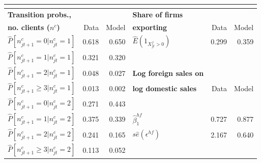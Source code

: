 \documentclass[notes=show]{beamer}
\begin{document}
\begin{frame}%


\begin{center}
{\small 
\begin{tabular}{llllll}
\multicolumn{6}{c}{} \\ \hline\hline
\textbf{Transition probs., }                   &                           &                           & \textbf{Share of firms }        &                            &                           \\
\textbf{no. clients (}$n^{c}$\textbf{)}        & \multicolumn{1}{r}{Data}  & \multicolumn{1}{r}{Model} & \textbf{exporting}              & \multicolumn{1}{r}{Data}   & \multicolumn{1}{r}{Model} \\ \hline
$\widehat{P}[n_{jt+1}^{c}=0|n_{jt}^{c}=1]$     & \multicolumn{1}{r}{0.618} & \multicolumn{1}{r}{0.650} & $\widehat{E}(1_{X_{jt}^{f}>0})$ & \multicolumn{1}{r}{0.299}  & \multicolumn{1}{r}{0.359} \\
$\widehat{P}[n_{jt+1}^{c}=1|n_{jt}^{c}=1]$     & \multicolumn{1}{r}{0.321} & \multicolumn{1}{r}{0.320} &                                 & \multicolumn{1}{r}{}       & \multicolumn{1}{r}{}      \\
$\widehat{P}[n_{jt+1}^{c}=2|n_{jt}^{c}=1]$     & \multicolumn{1}{r}{0.048} & \multicolumn{1}{r}{0.027} & \textbf{Log foreign sales on}   & \multicolumn{1}{r}{}       & \multicolumn{1}{r}{}      \\
$\widehat{P}[n_{jt+1}^{c}\geq 3|n_{jt}^{c}=1]$ & \multicolumn{1}{r}{0.013} & \multicolumn{1}{r}{0.002} & \textbf{log domestic sales}     & \multicolumn{1}{r}{ Data}  & \multicolumn{1}{r}{Model} \\ \cline{4-6}
$\widehat{P}[n_{jt+1}^{c}=0|n_{jt}^{c}=2]$     & \multicolumn{1}{r}{0.271} & \multicolumn{1}{r}{0.443} &                                 & \multicolumn{1}{r}{}       & \multicolumn{1}{r}{}      \\
$\widehat{P}[n_{jt+1}^{c}=1|n_{jt}^{c}=2]$     & \multicolumn{1}{r}{0.375} & \multicolumn{1}{r}{0.339} & $\widehat{\beta }_{1}^{hf}$     & \multicolumn{1}{r}{ 0.727} & \multicolumn{1}{r}{0.877} \\
$\widehat{P}[n_{jt+1}^{c}=2|n_{jt}^{c}=2]$     & \multicolumn{1}{r}{0.241} & \multicolumn{1}{r}{0.165} & $s\widehat{e}(\epsilon ^{hf})$  & \multicolumn{1}{r}{2.167}  & \multicolumn{1}{r}{0.640} \\
$\widehat{P}[n_{jt+1}^{c}\geq 3|n_{jt}^{c}=2]$ & \multicolumn{1}{r}{0.113} & \multicolumn{1}{r}{0.052} &                                 & \multicolumn{1}{r}{}       & \multicolumn{1}{r}{}      \\ \hline
\end{tabular}%
}
\end{center}

\end{frame}%
\end{document}
